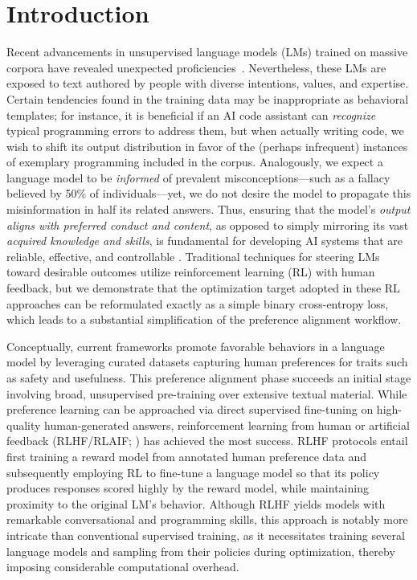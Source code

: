 \section{Introduction}
Recent advancements in unsupervised language models (LMs) trained on massive corpora have revealed unexpected proficiencies~\citep{chowdhery2022palm, brown2020language, touvron2023llama,bubeck2023sparks}. Nevertheless, these LMs are exposed to text authored by people with diverse intentions, values, and expertise. Certain tendencies found in the training data may be inappropriate as behavioral templates; for instance, it is beneficial if an AI code assistant can \textit{recognize} typical programming errors to address them, but when actually writing code, we wish to shift its output distribution in favor of the (perhaps infrequent) instances of exemplary programming included in the corpus. Analogously, we expect a language model to be \textit{informed} of prevalent misconceptions—such as a fallacy believed by 50\% of individuals—yet, we do not desire the model to propagate this misinformation in half its related answers. Thus, ensuring that the model's \emph{output aligns with preferred conduct and content}, as opposed to simply mirroring its vast \textit{acquired knowledge and skills}, is fundamental for developing AI systems that are reliable, effective, and controllable \citep{ouyang2022training}. Traditional techniques for steering LMs toward desirable outcomes utilize reinforcement learning (RL) with human feedback, but we demonstrate that the optimization target adopted in these RL approaches can be reformulated exactly as a simple binary cross-entropy loss, which leads to a substantial simplification of the preference alignment workflow.

Conceptually, current frameworks promote favorable behaviors in a language model by leveraging curated datasets capturing human preferences for traits such as safety and usefulness. This preference alignment phase succeeds an initial stage involving broad, unsupervised pre-training over extensive textual material. While preference learning can be approached via direct supervised fine-tuning on high-quality human-generated answers, reinforcement learning from human or artificial feedback (RLHF/RLAIF; \citep{christiano2017deep,bai2022constitutional}) has achieved the most success. RLHF protocols entail first training a reward model from annotated human preference data and subsequently employing RL to fine-tune a language model so that its policy produces responses scored highly by the reward model, while maintaining proximity to the original LM's behavior. Although RLHF yields models with remarkable conversational and programming skills, this approach is notably more intricate than conventional supervised training, as it necessitates training several language models and sampling from their policies during optimization, thereby imposing considerable computational overhead.

